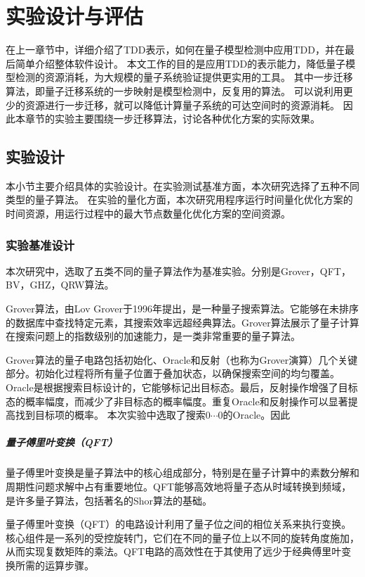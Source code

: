 \chapter{实验设计与评估}
\label{sec-ex}
在上一章节中，详细介绍了TDD表示，如何在量子模型检测中应用TDD，并在最后简单介绍整体软件设计。
本文工作的目的是应用TDD的表示能力，降低量子模型检测的资源消耗，为大规模的量子系统验证提供更实用的工具。
其中一步迁移算法，即量子迁移系统的一步映射是模型检测中，反复用的算法。
可以说利用更少的资源进行一步迁移，就可以降低计算量子系统的可达空间时的资源消耗。
因此本章节的实验主要围绕一步迁移算法，讨论各种优化方案的实际效果。
\section{实验设计}
本小节主要介绍具体的实验设计。在实验测试基准方面，本次研究选择了五种不同类型的量子算法。
在实验的量化方面，本次研究用程序运行时间量化优化方案的时间资源，用运行过程中的最大节点数量化优化方案的空间资源。
\subsection*{实验基准设计}
本次研究中，选取了五类不同的量子算法作为基准实验。分别是Grover，QFT，BV，GHZ，QRW算法。

Grover算法，由Lov Grover于1996年提出，是一种量子搜索算法\citep{Grover_1996}。它能够在未排序的数据库中查找特定元素，其搜索效率远超经典算法。Grover算法展示了量子计算在搜索问题上的指数级别的加速能力，是一类非常重要的量子算法。

Grover算法的量子电路包括初始化、Oracle和反射（也称为Grover演算）几个关键部分。初始化过程将所有量子位置于叠加状态，以确保搜索空间的均匀覆盖。Oracle是根据搜索目标设计的，它能够标记出目标态。最后，反射操作增强了目标态的概率幅度，而减少了非目标态的概率幅度。重复Oracle和反射操作可以显著提高找到目标项的概率。
本次实验中选取了搜索$0\cdots 0$的Oracle。因此

\paragraph{量子傅里叶变换（QFT）}
量子傅里叶变换是量子算法中的核心组成部分，特别是在量子计算中的素数分解和周期性问题求解中占有重要地位。QFT能够高效地将量子态从时域转换到频域，是许多量子算法，包括著名的Shor算法的基础。

量子傅里叶变换（QFT）的电路设计利用了量子位之间的相位关系来执行变换。核心组件是一系列的受控旋转门，它们在不同的量子位上以不同的旋转角度施加，从而实现复数矩阵的乘法。QFT电路的高效性在于其使用了远少于经典傅里叶变换所需的运算步骤。

